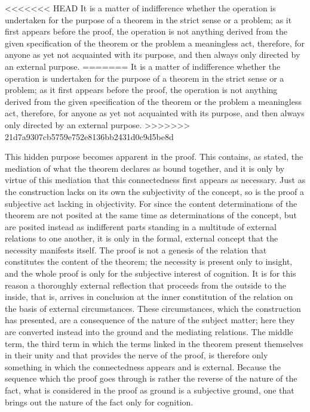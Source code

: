 <<<<<<< HEAD
It is a matter of indifference whether the operation is
undertaken for the purpose of a theorem in the strict sense or a problem;
as it first appears before the proof, the operation is not anything derived
from the given specification of the theorem or the problem
a meaningless
act, therefore, for anyone as yet not acquainted with its purpose, and then
always only directed by an external purpose.
=======
It is a matter of indifference
whether the operation is undertaken
for the purpose of a theorem
in the strict sense or a problem;
as it first appears before the proof,
the operation is not anything derived
from the given specification of the theorem
or the problem a meaningless act, therefore,
for anyone as yet not acquainted with its purpose,
and then always only directed by an external purpose.
>>>>>>> 21d7a9307cb5759e752e8136bb2431d0c9d5be8d

This hidden purpose becomes apparent in the proof.
This contains, as stated, the mediation of what
the theorem declares as bound together,
and it is only by virtue of this mediation
that this connectedness first appears as necessary.
Just as the construction lacks on its own
the subjectivity of the concept,
so is the proof a subjective act lacking in objectivity.
For since the content determinations of the theorem are
not posited at the same time as determinations of the concept,
but are posited instead as indifferent parts standing in
a multitude of external relations to one another,
it is only in the formal, external concept
that the necessity manifests itself.
The proof is not a genesis of the relation
that constitutes the content of the theorem;
the necessity is present only to insight,
and the whole proof is only for
the subjective interest of cognition.
It is for this reason
a thoroughly external reflection
that proceeds from the outside to the inside,
that is, arrives in conclusion at
the inner constitution of the relation
on the basis of external circumstances.
These circumstances, which the construction has presented,
are a consequence of the nature of the subject matter;
here they are converted instead into the ground
and the mediating relations.
The middle term, the third term in which
the terms linked in the theorem
present themselves in their unity
and that provides the nerve of the proof,
is therefore only something in which
the connectedness appears and is external.
Because the sequence which the proof goes through is
rather the reverse of the nature of the fact,
what is considered in the proof as ground is a subjective ground,
one that brings out the nature of the fact only for cognition.

